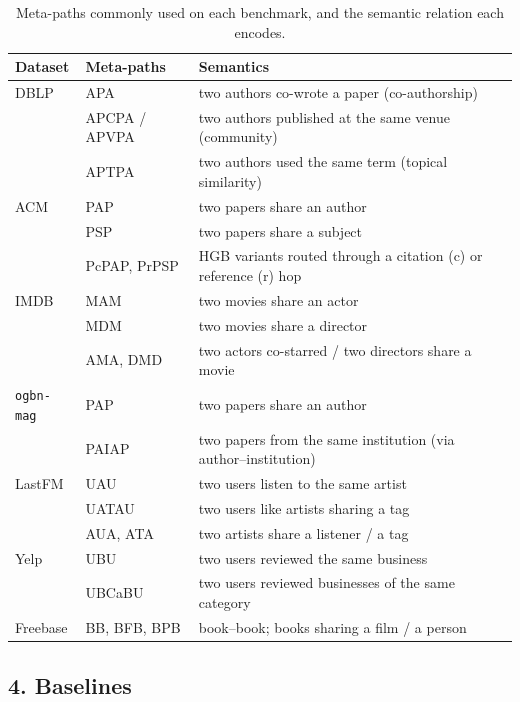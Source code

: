 \begin{table}[htbp]
\centering
\small
\caption{Meta-paths commonly used on each benchmark, and the semantic relation each encodes.}
\label{p2:tab:metapaths}
\begin{tabular}{llp{7.6cm}}
\toprule
Dataset & Meta-paths & Semantics \\
\midrule
DBLP & APA & two authors co-wrote a paper (co-authorship) \\
     & APCPA / APVPA & two authors published at the same venue (community) \\
     & APTPA & two authors used the same term (topical similarity) \\
\midrule
ACM  & PAP & two papers share an author \\
     & PSP & two papers share a subject \\
     & PcPAP, PrPSP & HGB variants routed through a citation (c) or reference (r) hop \\
\midrule
IMDB & MAM & two movies share an actor \\
     & MDM & two movies share a director \\
     & AMA, DMD & two actors co-starred / two directors share a movie \\
\midrule
\texttt{ogbn-mag} & PAP & two papers share an author \\
     & PAIAP & two papers from the same institution (via author--institution) \\
\midrule
LastFM & UAU & two users listen to the same artist \\
     & UATAU & two users like artists sharing a tag \\
     & AUA, ATA & two artists share a listener / a tag \\
\midrule
Yelp & UBU & two users reviewed the same business \\
     & UBCaBU & two users reviewed businesses of the same category \\
\midrule
Freebase & BB, BFB, BPB & book--book; books sharing a film / a person \\
\bottomrule
\end{tabular}
\end{table}

\clearpage
\subsection*{4. Baselines}

